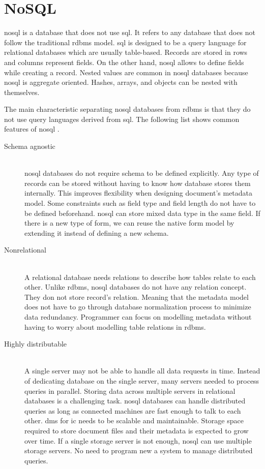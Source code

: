 \section{NoSQL}
\gls{nosql} is a database that does not use \gls{sql}.
It refers to any database that does not follow the traditional \gls{rdbms} model.
\gls{sql} is designed to be a query language for relational databases which are usually table-based.
Records are stored in rows and columns represent fields.
On the other hand, \gls{nosql} allows to define fields while creating a record.
Nested values are common in \gls{nosql} databases because \gls{nosql} is aggregate oriented.
Hashes, arrays, and objects can be nested with themselves.

The main characteristic separating \gls{nosql} databases from \gls{rdbms} is that they do not use query languages derived from \gls{sql}. 
The following list shows common features of \gls{nosql} \cite[p.~12-16]{nosql-for-dummies}.
\begin{description}
	\item[Schema agnostic] \hfill \\
	\gls{nosql} databases do not require schema to be defined explicitly.
	Any type of records can be stored without having to know how database stores them internally.
	This improves flexibility when designing document's metadata model.
	Some constraints such as field type and field length do not have to be defined beforehand.
	\gls{nosql} can store mixed data type in the same field.
	If there is a new type of form, we can reuse the native form model by extending it instead of defining a new schema.
	\item[Nonrelational] \hfill \\
	A relational database needs relations to describe how tables relate to each other.
	Unlike \gls{rdbms}, \gls{nosql} databases do not have any relation concept.
	They don not store record's relation.
	Meaning that the metadata model does not have to go through database normalization process to minimize data redundancy.
	Programmer can focus on modelling metadata without having to worry about modelling table relations in \gls{rdbms}.
	
	\item[Highly distributable] \hfill \\
	A single server may not be able to handle all data requests in time.
	Instead of dedicating database on the single server, many servers needed to process queries in parallel.
	Storing data across multiple servers in relational databases is a challenging task.
	\gls{nosql} databases can handle distributed queries as long as connected machines are fast enough to talk to each other.
	\gls{dms} for \gls{ic} needs to be scalable and maintainable.
	Storage space required to store document files and their metadata is expected to grow over time.
	If a single storage server is not enough, \gls{nosql} can use multiple storage servers.
	No need to program new a system to manage distributed queries.
\end{description}

